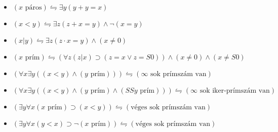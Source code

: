 \documentclass{article}
\begin{document}
\begin{itemize}
\item $ (x \text{ páros}) \leftrightharpoons \exists y(y+y=x)$\\
\item$ (x < y) \leftrightharpoons \exists z(z+x=y) \wedge \neg (x=y)$ \\
\item $(x \vert y) \leftrightharpoons \exists z ( z \cdot x=y )\wedge ( x \neq 0)$ \\
\item$(x \text{ prím}) \leftrightharpoons  (\forall z( z \vert x )\supset ( z = x \vee z=S0))\wedge ( x \neq 0)\wedge ( x \neq S0)$ \\
\item $(\forall x \exists y ((x<y)\wedge(y \text{ prím})))\leftrightharpoons(\infty \text{ sok prímszám van})$\\
\item $(\forall x \exists y  ((x<y)\wedge(y \text{ prím})\wedge(SSy \text{ prím})))\leftrightharpoons(\infty \text{ sok iker-prímszám van}) $ \\
\item $(\exists y \forall x (x \text{ prím}) \supset (x<y)) \leftrightharpoons(\text{véges sok prímszám van})$ \\
\item $(\exists y \forall x (y<x) \supset \neg (x \text{ prím}))\leftrightharpoons(\text{véges sok prímszám van}) $ \\
\end{itemize}
 
\end{document}
